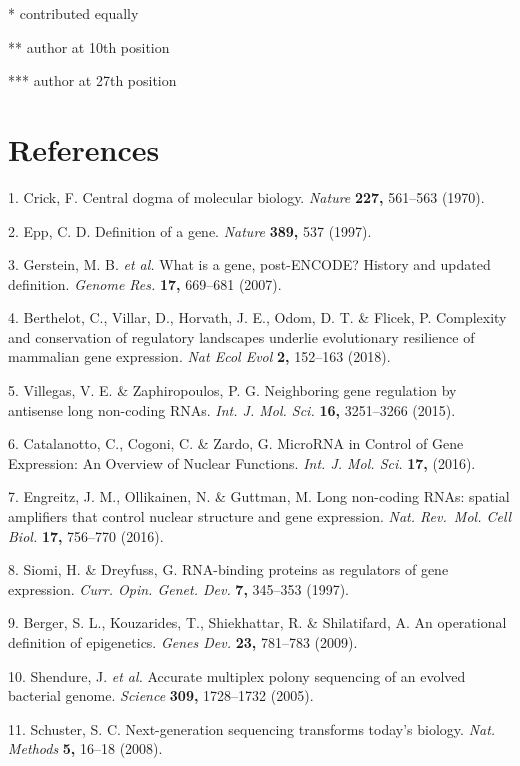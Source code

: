 \documentclass[11pt,twoside]{MPIthesis}
\theoremstyle{definition}
\theoremstyle{definition}
\theoremstyle{definition}
\theoremstyle{remark}
\begin{document}
* contributed equally

** author at 10th position

*** author at 27th position

\backmatter

\chapter*{References}\label{references}

\noindent

1. Crick, F. Central dogma of molecular biology. \emph{Nature}
\textbf{227,} 561--563 (1970).

2. Epp, C. D. Definition of a gene. \emph{Nature} \textbf{389,} 537
(1997).

3. Gerstein, M. B. \emph{et al.} What is a gene, post-ENCODE? History
and updated definition. \emph{Genome Res.} \textbf{17,} 669--681 (2007).

4. Berthelot, C., Villar, D., Horvath, J. E., Odom, D. T. \& Flicek, P.
Complexity and conservation of regulatory landscapes underlie
evolutionary resilience of mammalian gene expression. \emph{Nat Ecol
Evol} \textbf{2,} 152--163 (2018).

5. Villegas, V. E. \& Zaphiropoulos, P. G. Neighboring gene regulation
by antisense long non-coding RNAs. \emph{Int. J. Mol. Sci.} \textbf{16,}
3251--3266 (2015).

6. Catalanotto, C., Cogoni, C. \& Zardo, G. MicroRNA in Control of Gene
Expression: An Overview of Nuclear Functions. \emph{Int. J. Mol. Sci.}
\textbf{17,} (2016).

7. Engreitz, J. M., Ollikainen, N. \& Guttman, M. Long non-coding RNAs:
spatial amplifiers that control nuclear structure and gene expression.
\emph{Nat. Rev.~Mol. Cell Biol.} \textbf{17,} 756--770 (2016).

8. Siomi, H. \& Dreyfuss, G. RNA-binding proteins as regulators of gene
expression. \emph{Curr. Opin. Genet. Dev.} \textbf{7,} 345--353 (1997).

9. Berger, S. L., Kouzarides, T., Shiekhattar, R. \& Shilatifard, A. An
operational definition of epigenetics. \emph{Genes Dev.} \textbf{23,}
781--783 (2009).

10. Shendure, J. \emph{et al.} Accurate multiplex polony sequencing of
an evolved bacterial genome. \emph{Science} \textbf{309,} 1728--1732
(2005).

11. Schuster, S. C. Next-generation sequencing transforms today's
biology. \emph{Nat. Methods} \textbf{5,} 16--18 (2008).
\end{document}
